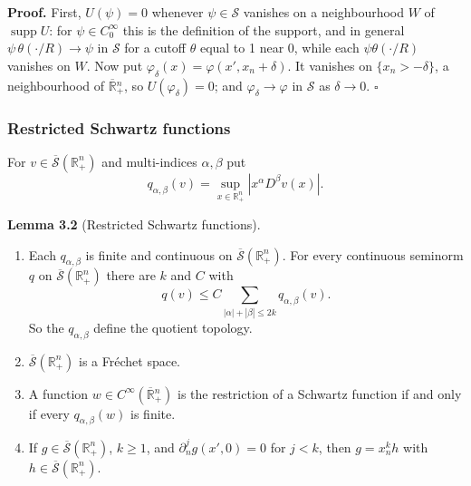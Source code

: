 \documentclass[
  11pt,
]{article}
\begin{document}
\textbf{Proof.} First, \(U(\psi)=0\) whenever \(\psi\in\mathcal S\)
vanishes on a neighbourhood \(W\) of \(\operatorname{supp}U\): for
\(\psi\in C_0^\infty\) this is the definition of the support, and in
general \(\psi\,\theta(\cdot/R)\to\psi\) in \(\mathcal S\) for a cutoff
\(\theta\) equal to 1 near 0, while each \(\psi\theta(\cdot/R)\)
vanishes on \(W\). Now put \(\varphi_\delta(x)=\varphi(x',x_n+\delta)\).
It vanishes on \(\{x_n>-\delta\}\), a neighbourhood of
\(\overline{\mathbb R}{}^n_+\), so \(U(\varphi_\delta)=0\); and
\(\varphi_\delta\to\varphi\) in \(\mathcal S\) as \(\delta\to0\).
\(\square\)

\subsubsection{Restricted Schwartz
functions}\label{restricted-schwartz-functions}

For \(v\in\overline{\mathcal S}(\mathbb R^n_+)\) and multi-indices
\(\alpha,\beta\) put \[
q_{\alpha,\beta}(v)=\sup_{x\in\mathbb R^n_+}|x^\alpha D^\beta v(x)| .
\]

\textbf{Lemma 3.2} (Restricted Schwartz functions).

\begin{enumerate}
\def\labelenumi{(\alph{enumi})}
\item
  Each \(q_{\alpha,\beta}\) is finite and continuous on
  \(\overline{\mathcal S}(\mathbb R^n_+)\). For every continuous
  seminorm \(q\) on \(\overline{\mathcal S}(\mathbb R^n_+)\) there are
  \(k\) and \(C\) with \[
q(v)\leq C\sum_{|\alpha|+|\beta|\leq2k}q_{\alpha,\beta}(v) .
\tag{3.1}
\] So the \(q_{\alpha,\beta}\) define the quotient topology.
\item
  \(\overline{\mathcal S}(\mathbb R^n_+)\) is a Fréchet space.
\item
  A function \(w\in C^\infty(\overline{\mathbb R}{}^n_+)\) is the
  restriction of a Schwartz function if and only if every
  \(q_{\alpha,\beta}(w)\) is finite.
\item
  If \(g\in\overline{\mathcal S}(\mathbb R^n_+)\), \(k\geq1\), and
  \(\partial_n^jg(x',0)=0\) for \(j<k\), then \(g=x_n^kh\) with
  \(h\in\overline{\mathcal S}(\mathbb R^n_+)\).
\end{enumerate}
\end{document}
